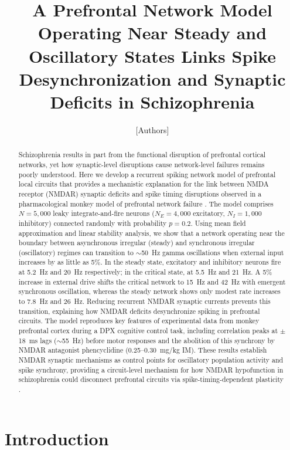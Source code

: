 \documentclass[10pt]{article}
\title{A Prefrontal Network Model Operating Near Steady and Oscillatory States Links Spike Desynchronization and Synaptic Deficits in Schizophrenia}
\author{[Authors]}
\date{}
\begin{document}
\maketitle

\begin{abstract}
Schizophrenia results in part from the functional disruption of prefrontal cortical networks, yet how synaptic-level disruptions cause network-level failures remains poorly understood. Here we develop a recurrent spiking network model of prefrontal local circuits that provides a mechanistic explanation for the link between NMDA receptor (NMDAR) synaptic deficits and spike timing disruptions observed in a pharmacological monkey model of prefrontal network failure \citep{zick2018blocking}. The model comprises $N = 5{,}000$ leaky integrate-and-fire neurons ($N_E = 4{,}000$ excitatory, $N_I = 1{,}000$ inhibitory) connected randomly with probability $p = 0.2$. Using mean field approximation and linear stability analysis, we show that a network operating near the boundary between asynchronous irregular (steady) and synchronous irregular (oscillatory) regimes can transition to $\sim$50~Hz gamma oscillations when external input increases by as little as 5\%. In the steady state, excitatory and inhibitory neurons fire at 5.2~Hz and 20~Hz respectively; in the critical state, at 5.5~Hz and 21~Hz. A 5\% increase in external drive shifts the critical network to 15~Hz and 42~Hz with emergent synchronous oscillation, whereas the steady network shows only modest rate increases to 7.8~Hz and 26~Hz. Reducing recurrent NMDAR synaptic currents prevents this transition, explaining how NMDAR deficits desynchronize spiking in prefrontal circuits. The model reproduces key features of experimental data from monkey prefrontal cortex during a DPX cognitive control task, including correlation peaks at $\pm$18~ms lags ($\sim$55~Hz) before motor responses and the abolition of this synchrony by NMDAR antagonist phencyclidine (0.25--0.30~mg/kg IM). These results establish NMDAR synaptic mechanisms as control points for oscillatory population activity and spike synchrony, providing a circuit-level mechanism for how NMDAR hypofunction in schizophrenia could disconnect prefrontal circuits via spike-timing-dependent plasticity \citep{dan2004spike, zick2021disparate}.
\end{abstract}

\section{Introduction}
\end{document}
